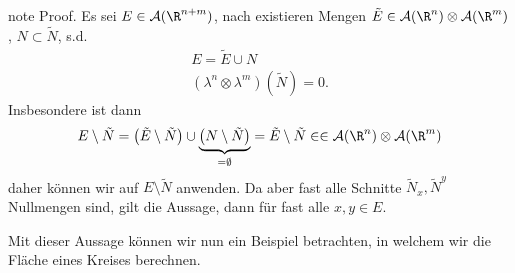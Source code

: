 \documentclass[letterpaper,10pt,german]{jupyterBook}
\begin{document}
\begin{sphinxadmonition}{note}
\sphinxAtStartPar
Proof. Es sei \(E\in \mathcal{A}(\R^{n+m})\), nach {\hyperref[\detokenize{masstheorie/integrationstechnik:lem:completelebesgue}]{}} existieren Mengen \(\tilde{E}\in\mathcal{A}(\R^n)\otimes\mathcal{A}(\R^m)\), \(N\subset \tilde{N}\), s.d.
\begin{equation*}
\begin{split}E = \tilde{E}\cup N\\
(\lambda^n\otimes\lambda^m)(\tilde{N}) = 0.\end{split}
\end{equation*}
\sphinxAtStartPar
Insbesondere ist dann
\begin{equation*}
\begin{split}E\setminus \tilde{N} = \left(\tilde{E}\setminus \tilde{N} \right)\cup \underbrace{\left(N\setminus \tilde{N}\right)}_{=\emptyset} = 
\tilde{E}\setminus \tilde{N}\in \in\mathcal{A}(\R^n)\otimes\mathcal{A}(\R^m)\end{split}
\end{equation*}
\sphinxAtStartPar
daher können wir {\hyperref[\detokenize{masstheorie/integrationstechnik:thm:cavalieri}]{}} auf \(E\setminus \tilde{N}\) anwenden. Da aber fast alle Schnitte \(\tilde{N}_x,\tilde{N}^y\) Nullmengen sind, gilt die Aussage, dann für fast alle \(x,y\in E\).
\end{sphinxadmonition}

\sphinxAtStartPar
Mit dieser Aussage können wir nun ein Beispiel betrachten, in welchem wir die Fläche eines Kreises berechnen.
\end{document}
